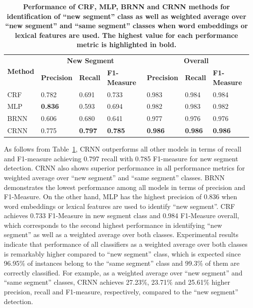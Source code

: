 \documentclass{amia}
\begin{document}
\begin{table}[ht]
\centering
\caption{\textbf{Performance of CRF, MLP, BRNN and CRNN methods for identification of ``new segment'' class as well as weighted average over ``new segment'' and ``same segment'' classes when word embeddings or lexical features are used. The highest value for each performance metric is highlighted in bold.}}
\label{tab:result_base}
  \begin{tabular}{|l|l|l|l|l|l|l|}
  \hline
   \multirow{2}{*}{\textbf{Method}} & \multicolumn{3}{|c|}{\textbf{New Segment}} & \multicolumn{3}{|c|}{\textbf{Overall}} \\\cline{2-7}
   & \textbf{Precision}  & \textbf{Recall} & \textbf{F1-Measure} & \textbf{Precision}  & \textbf{Recall} & \textbf{F1-Measure} \\ \hline    
 CRF & 0.782 & 0.691 & 0.733 & 0.983 & 0.984 & 0.984 \\ \hline
 MLP & \textbf{0.836} & 0.593 & 0.694 & 0.982 & 0.983 & 0.982 \\ \hline
 BRNN & 0.606 & 0.680 & 0.641 & 0.977 & 0.976 & 0.976 \\ \hline
 CRNN & 0.775 & \textbf{0.797} & \textbf{0.785} & \textbf{0.986} & \textbf{0.986} & \textbf{0.986} \\ \hline
  \end{tabular}
\end{table}                              

As follows from Table~\ref{tab:result_base}, CRNN outperforms all other models in terms of recall and F1-measure achieving 0.797 recall with 0.785 F1-measure for new segment detection. CRNN also shows superior performance in all performance metrics for weighted average over ``new segment'' and ``same segment'' classes. BRNN demonstrates the lowest performance among all models in terms of precision and F1-Measure. On the other hand, MLP has the highest precision of 0.836 when word embeddings or lexical features are used to identify ``new segment''. CRF achieves 0.733 F1-Measure in new segment class and 0.984 F1-Measure overall, which corresponds to the second highest performance in identifying ``new segment'' as well as a weighted average over both classes. Experimental results indicate that performance of all classifiers as a weighted average over both classes is remarkably higher compared to ``new segment'' class, which is expected since 96.95\% of instances belong to the ``same segment'' class and 99.3\% of them are correctly classified. For example, as a weighted average over ``new segment'' and ``same segment'' classes, CRNN achieves 27.23\%, 23.71\% and 25.61\% higher precision, recall and F1-measure, respectively, compared to the ``new segment'' detection. \\
\end{document}
